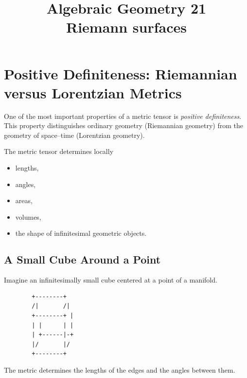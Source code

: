 \documentclass[12pt,a4paper]{article}
\theoremstyle{notespace}
\begin{document}
\title{Algebraic Geometry 21\\
	\large Riemann surfaces}
\author{}
\date{}

	\maketitle
	

	\setcounter{section}{0}

\tableofcontents

	\clearpage


\section{Positive Definiteness: Riemannian versus Lorentzian Metrics}

One of the most important properties of a metric tensor is
\emph{positive definiteness}. This property distinguishes
ordinary geometry (Riemannian geometry) from the geometry of
space--time (Lorentzian geometry).

\bigskip

The metric tensor determines locally

\begin{itemize}
	\item lengths,
	\item angles,
	\item areas,
	\item volumes,
	\item the shape of infinitesimal geometric objects.
\end{itemize}


\subsection{A Small Cube Around a Point}

Imagine an infinitesimally small cube centered at a point of a manifold.

\bigskip

\begin{center}
	\begin{verbatim}
		+--------+
		/|       /|
		+--------+ |
		| |      | |
		| +------|-+
		|/       |/
		+--------+
	\end{verbatim}
\end{center}

The metric determines the lengths of the edges and the angles between
them.
\end{document}
